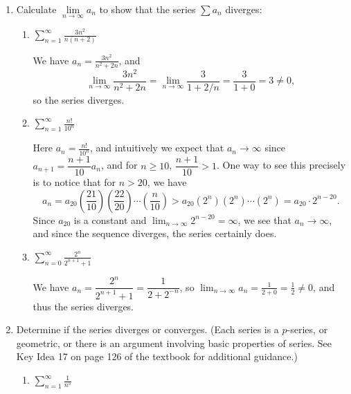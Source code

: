 \documentclass[12pt]{article}
\newcommand{\di}{\displaystyle}
\begin{document}
\thispagestyle{fancy}


\begin{enumerate}
 \item Calculate $\lim\limits_{n\to\infty}a_n$ to show that the series $\sum a_n$ diverges:

\begin{enumerate}
 \item $\di \sum_{n=1}^\infty \frac{3n^2}{n(n+2)}$
 
 \bigskip
 
 We have $a_n = \frac{3n^2}{n^2+2n}$, and
 \[
 \lim_{n\to\infty}\frac{3n^2}{n^2+2n} = \lim_{n\to\infty}\frac{3}{1+2/n} = \frac{3}{1+0} = 3\neq 0,
 \]
 so the series diverges.
 
 \item $\di \sum_{n=1}^\infty \frac{n!}{10^n}$

\bigskip

 Here $a_n = \frac{n!}{10^n}$, and intuitively we expect that $a_n\to \infty$ since $a_{n+1} = \dfrac{n+1}{10}a_n$, and for $n\geq 10$, $\dfrac{n+1}{10}>1$. One way to see this precisely is to notice that for $n>20$, we have
 \[
 a_n = a_{20}\left(\frac{21}{10}\right)\left(\frac{22}{20}\right)\cdots\left(\frac{n}{10}\right)>a_{20}(2^n)(2^n)\cdots (2^n) = a_{20}\cdot 2^{n-20}.
 \]
 Since $a_{20}$ is a constant and $\lim_{n\to \infty}2^{n-20} =\infty$, we see that $a_n\to \infty$, and since the sequence diverges, the series certainly does.
 

 \item $\di \sum_{n=0}^\infty \frac{2^n}{2^{n+1}+1}$
 
 \bigskip
 
 We have $a_n = \dfrac{2^n}{2^{n+1}+1} = \dfrac{1}{2+2^{-n}}$, so $\di\lim_{n\to\infty}a_n = \frac{1}{2+0} = \frac{1}{2}\neq 0$, and thus the series diverges.
 
\end{enumerate}

 \item Determine if the series diverges or converges. (Each series is a $p$-series, or geometric, or there is an argument involving basic properties of series. See Key Idea 17 on page 126 of the textbook for additional guidance.)

\begin{enumerate}
 \item $\di \sum_{n=1}^\infty\frac{1}{n^5}$
 
 \bigskip
 

\end{enumerate}
\end{enumerate}
\end{document}
